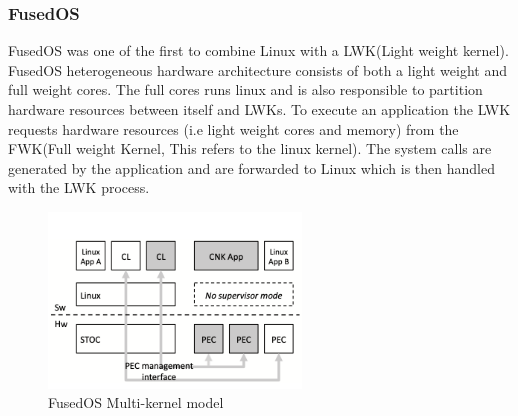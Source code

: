 \subsubsection{FusedOS}
FusedOS\cite{FusedOS} was one of the first to combine 
Linux with a LWK(Light weight kernel). FusedOS 
heterogeneous hardware architecture 
consists of both a light weight and full 
weight cores. The full cores runs linux and 
is also responsible to partition hardware 
resources between itself and LWKs.
To execute an application the LWK requests 
hardware resources (i.e light weight cores and memory) 
from the FWK(Full weight Kernel, This refers to the 
linux kernel). The system calls are generated 
by the application and are forwarded to Linux 
which is then handled with the LWK process. 

\begin{figure}[htbp!] 
  \centering    
  \includegraphics[width=0.6\textwidth]{FigsMultikernel/fusedOSarchitecture}
  \caption[Multi-kernel]{FusedOS Multi-kernel model \cite{FusedOS}}
  \label{fig:FusedOS}
  \end{figure}

